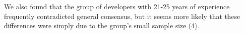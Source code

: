 We also found that the group of developers with 21-25 years of experience frequently contradicted general consensus, but it seems more likely that these differences were simply due to the group's small sample size (4).

